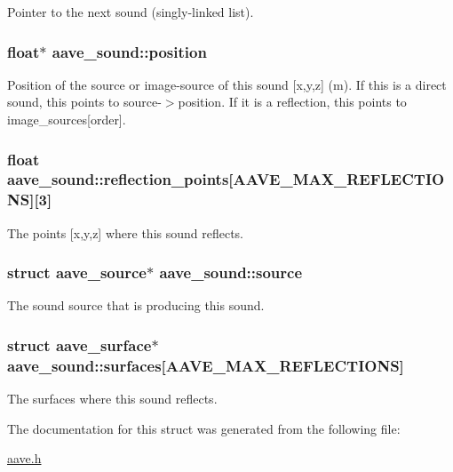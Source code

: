 Pointer to the next sound (singly-\/linked list). \hypertarget{structaave__sound_a04a3c01ca0a54233061a2e2ebac1b464}{
\subsubsection[{position}]{\setlength{\rightskip}{0pt plus 5cm}float$\ast$ aave\-\_\-sound\-::position}}\label{structaave__sound_a04a3c01ca0a54233061a2e2ebac1b464}
Position of the source or image-\/source of this sound \mbox{[}x,y,z\mbox{]} (m). If this is a direct sound, this points to source-\/$>$position. If it is a reflection, this points to image\-\_\-sources\mbox{[}order\mbox{]}. \hypertarget{structaave__sound_a06b4b094d9e92084c8b10a99bfe74e5e}{
\subsubsection[{reflection\-\_\-points}]{\setlength{\rightskip}{0pt plus 5cm}float aave\-\_\-sound\-::reflection\-\_\-points\mbox{[}{\bf A\-A\-V\-E\-\_\-\-M\-A\-X\-\_\-\-R\-E\-F\-L\-E\-C\-T\-I\-O\-N\-S}\mbox{]}\mbox{[}3\mbox{]}}}\label{structaave__sound_a06b4b094d9e92084c8b10a99bfe74e5e}
The points \mbox{[}x,y,z\mbox{]} where this sound reflects. \hypertarget{structaave__sound_ac56f4ab64afcb0668832301110e3bfdb}{
\subsubsection[{source}]{\setlength{\rightskip}{0pt plus 5cm}struct {\bf aave\-\_\-source}$\ast$ aave\-\_\-sound\-::source}}\label{structaave__sound_ac56f4ab64afcb0668832301110e3bfdb}
The sound source that is producing this sound. \hypertarget{structaave__sound_a4d8cbff05fc5af52a18ac1c9015cfc97}{
\subsubsection[{surfaces}]{\setlength{\rightskip}{0pt plus 5cm}struct {\bf aave\-\_\-surface}$\ast$ aave\-\_\-sound\-::surfaces\mbox{[}{\bf A\-A\-V\-E\-\_\-\-M\-A\-X\-\_\-\-R\-E\-F\-L\-E\-C\-T\-I\-O\-N\-S}\mbox{]}}}\label{structaave__sound_a4d8cbff05fc5af52a18ac1c9015cfc97}
The surfaces where this sound reflects. 

The documentation for this struct was generated from the following file\-:\begin{DoxyCompactItemize}
\item 
\hyperlink{aave_8h}{aave.\-h}\end{DoxyCompactItemize}
